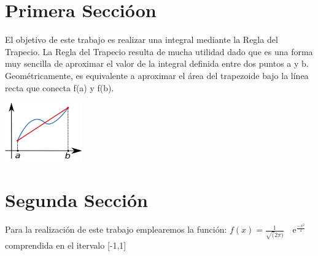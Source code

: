 

\section{Primera Seccióon}
\label{1:sec:1}
\parindent=0.5cm
\raggedright
El objetivo de este trabajo es realizar una integral mediante la Regla del Trapecio. La Regla
del Trapecio resulta de mucha utilidad dado que es una forma muy sencilla de aproximar el valor de
la integral definida entre dos puntos a y b. Geométricamente, es equivalente a aproximar el área del 
trapezoide bajo la línea recta que conecta f(a) y f(b).




\begin{center}
\includegraphics[width=0.25\textwidth]{images/Regla-Trapecio.eps}
\end{center}

\section{Segunda Sección}
\label{1:sec:2}
\parindent=0.5cm
\raggedright
Para la realización de este trabajo emplearemos la función:
$f(x)=\frac{1}{\sqrt(2\pi)} \quad\text{e}^{\frac{-x^2}{2}}$
comprendida en el itervalo [-1,1]
